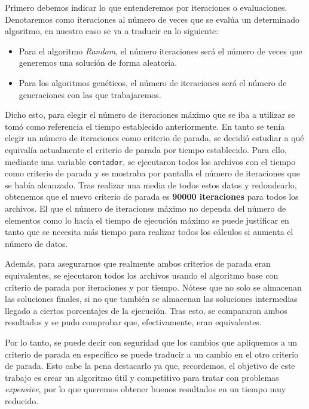 Primero debemos indicar lo que entenderemos por iteraciones o evaluaciones. 
Denotaremos como iteraciones al número de veces que se evalúa un determinado algoritmo, en nuestro caso se va a traducir en lo siguiente: 
\begin{itemize}
	\item Para el algoritmo \textit{Random}, el número iteraciones será el número de veces que generemos una solución de forma aleatoria.
	\item Para los algoritmos genéticos, el número de iteraciones será el número de generaciones con las que trabajaremos.
\end{itemize}

Dicho esto, para elegir el número de iteraciones máximo que se iba a utilizar se tomó como referencia el tiempo establecido anteriormente. 
En tanto se tenía elegir un número de iteraciones como criterio de parada, se decidió estudiar a qué equivalía actualmente el criterio de parada por tiempo establecido. 
Para ello, mediante una variable \texttt{contador}, se ejecutaron todos los archivos con el tiempo como criterio de parada y se mostraba por pantalla el número de iteraciones que se había alcanzado. 
Tras realizar una media de todos estos datos y redondearlo, obtenemos que el nuevo criterio de parada es \textbf{90000 iteraciones} para todos los archivos. 
El que el número de iteraciones máximo no dependa del número de elementos como lo hacía el tiempo de ejecución máximo se puede justificar en tanto que se necesita más tiempo para realizar todos los cálculos si aumenta el número de datos. 

Además, para asegurarnos que realmente ambos criterios de parada eran equivalentes, se ejecutaron todos los archivos usando el algoritmo base con criterio de parada por iteraciones y por tiempo. 
Nótese que no solo se almacenan las soluciones finales, si no que también se almacenan las soluciones intermedias llegado a ciertos porcentajes de la ejecución. 
Tras esto, se compararon ambos resultados y se pudo comprobar que, efectivamente, eran equivalentes. 

Por lo tanto, se puede decir con seguridad que los cambios que apliquemos a un criterio de parada en específico se puede traducir a un cambio en el otro criterio de parada. 
Esto cabe la pena destacarlo ya que, recordemos, el objetivo de este trabajo es crear un algoritmo útil y competitivo para tratar con problemas \textit{expensive}, por lo que queremos obtener buenos resultados en un tiempo muy reducido. 

